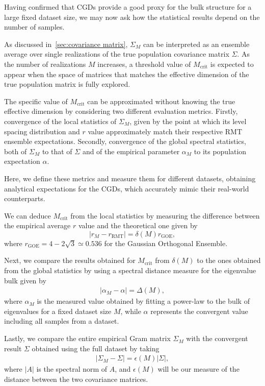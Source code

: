\documentclass{article}
\begin{document}
Having confirmed that CGDs provide a good proxy for the bulk structure for a large fixed dataset size, we may now ask how the statistical results depend on the number of samples.

As discussed in~\cref{sec:covariance matrix}, $\Sigma_M$ can be interpreted as an ensemble average over single realizations of the true population covariance matrix $\Sigma$. As the number of realizations $M$ increases, a threshold value of $M_\mathrm{crit}$ is expected to appear when the space of matrices that matches the effective dimension of the true population matrix is fully explored.

The specific value of $M_\mathrm{crit}$ can be approximated without knowing the true effective dimension by considering two different evaluation metrics. Firstly, convergence of the local statistics of $\Sigma_M$, given by the point at which its level spacing distribution and $r$ value approximately match their respective RMT ensemble expectations.
Secondly, convergence of the global spectral statistics, both of $\Sigma_M$ to that of $\Sigma$ and of the empirical parameter $\alpha_M$ to its population expectation $\alpha$.

Here, we define these metrics and measure them for different datasets, obtaining analytical expectations for the CGDs, which accurately mimic their real-world counterparts.

We can deduce $M_\mathrm{crit}$ from the local statistics by measuring the difference between the empirical average $r$ value and the theoretical one given by
\begin{equation}
\label{eq:r_scaling}
|r_M - r_\mathrm{RMT} | = \delta(M) r_\mathrm{GOE},
\end{equation}
where $r_\mathrm{GOE} = 4-2\sqrt{3} \simeq 0.536$ for the Gaussian Orthogonal Ensemble.

Next, we compare the results obtained for $M_\mathrm{crit}$ from $\delta(M)$ to the ones obtained from the global statistics by using a spectral distance measure for the eigenvalue bulk given by
\begin{align}
\label{eq:alpha_scaling}
| \alpha_M - \alpha |
= \Delta(M),
\end{align}
where $\alpha_M$ is the measured value obtained by fitting a power-law to the bulk of eigenvalues for a fixed dataset size $M$, while $\alpha$ represents the convergent value including all samples from a dataset.

Lastly, we compare the entire empirical Gram matrix $\Sigma_M$ with the convergent result $\Sigma$ obtained using the full dataset by taking
\begin{align}
\label{eq:sigma_scaling}
{| \Sigma_M - \Sigma |}
= \epsilon(M) | \Sigma |,
\end{align}
where $|A|$ is the spectral norm of $A$, and $\epsilon(M)$ will be our measure of the distance between the two covariance matrices.
\end{document}
